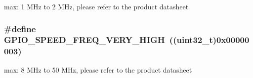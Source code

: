 max\-: 1 M\-Hz to 2 M\-Hz, please refer to the product datasheet \hypertarget{group___g_p_i_o__speed_ga1944cf10e2ab172810d38b681d40b771}{
\subsubsection[{G\-P\-I\-O\-\_\-\-S\-P\-E\-E\-D\-\_\-\-F\-R\-E\-Q\-\_\-\-V\-E\-R\-Y\-\_\-\-H\-I\-G\-H}]{\setlength{\rightskip}{0pt plus 5cm}\#define G\-P\-I\-O\-\_\-\-S\-P\-E\-E\-D\-\_\-\-F\-R\-E\-Q\-\_\-\-V\-E\-R\-Y\-\_\-\-H\-I\-G\-H~((uint32\-\_\-t)0x00000003)}}\label{group___g_p_i_o__speed_ga1944cf10e2ab172810d38b681d40b771}
max\-: 8 M\-Hz to 50 M\-Hz, please refer to the product datasheet 